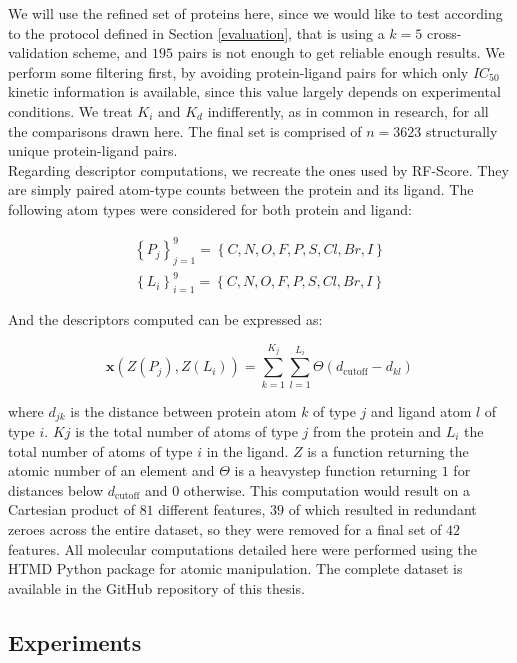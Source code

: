 \documentclass[10pt,a4paper,twoside]{book}
\begin{document}
We will use the refined set of proteins here, since we would like to test according to the protocol defined in Section \ref{evaluation}, that is using a $k=5$ cross-validation scheme, and $195$ pairs is not enough to get reliable enough results. We perform some filtering first, by avoiding protein-ligand pairs for which only $IC_{50}$ kinetic information is available, since this value largely depends on experimental conditions. We treat $K_i$ and $K_d$ indifferently, as in common in research, for all the comparisons drawn here. The final set is comprised of $n=3623$ structurally unique protein-ligand pairs.\\

Regarding descriptor computations, we recreate the ones used by RF-Score. They are simply paired atom-type counts between the protein and its ligand. The following atom types were considered for both protein and ligand:

\begin{align*}
\left\lbrace P_j \right\rbrace_{j=1}^9 = \left\lbrace C, N, O, F, P, S, Cl, Br, I \right\rbrace \\
\left\lbrace L_i \right\rbrace_{i=1}^9 = \left\lbrace C, N, O, F, P, S, Cl, Br, I \right\rbrace
\end{align*}

And the descriptors computed can be expressed as:

\begin{equation}
\boldsymbol{x}\left(Z(P_j), Z(L_i)\right) = \sum_{k=1}^{K_j}\sum_{l=1}^{L_i}\Theta (d_{\mathrm{cutoff}} - d_{kl})
\end{equation}

where $d_{jk}$ is the distance between protein atom $k$ of type $j$ and ligand atom $l$ of type $i$. $Kj$ is the total number of atoms of type $j$ from the protein and $L_i$ the total number of atoms of type $i$ in the ligand. $Z$ is a function returning the atomic number of an element and $\Theta$ is a heavystep function returning $1$ for distances below $d_{\mathrm{cutoff}}$ and $0$ otherwise. This computation would result on a Cartesian product of $81$ different features, $39$ of which resulted in redundant zeroes across the entire dataset, so they were removed for a final set of $42$ features. All molecular computations detailed here were performed using the HTMD Python package \cite{Doerr2016} for atomic manipulation. The complete dataset is available in the GitHub repository of this thesis.


\subsection{Experiments}
\end{document}
